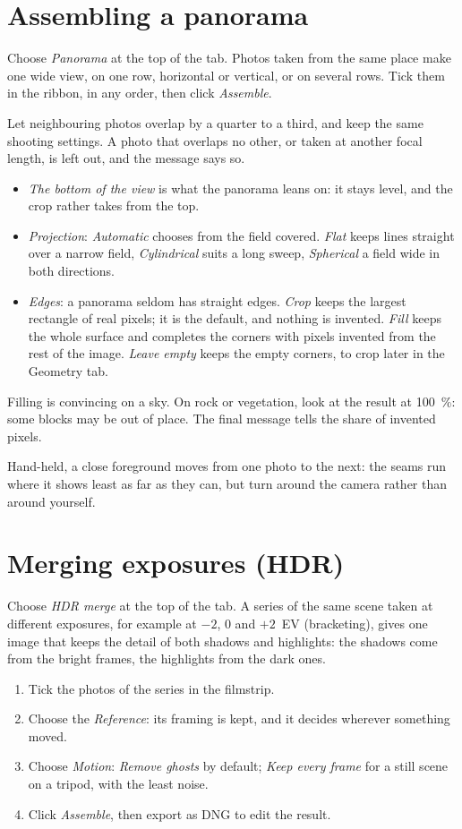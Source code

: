\section{Assembling a panorama}
Choose \emph{Panorama} at the top of the tab. Photos taken from the same place make one wide
view, on one row, horizontal or vertical, or on several rows. Tick them in the ribbon, in any
order, then click \emph{Assemble}.

Let neighbouring photos overlap by a quarter to a third, and keep the same shooting settings.
A photo that overlaps no other, or taken at another focal length, is left out, and the message
says so.

\begin{itemize}
\item \emph{The bottom of the view} is what the panorama leans on: it stays level, and the
crop rather takes from the top.
\item \emph{Projection}: \emph{Automatic} chooses from the field covered. \emph{Flat} keeps
lines straight over a narrow field, \emph{Cylindrical} suits a long sweep, \emph{Spherical} a
field wide in both directions.
\item \emph{Edges}: a panorama seldom has straight edges. \emph{Crop} keeps the largest
rectangle of real pixels; it is the default, and nothing is invented. \emph{Fill} keeps the
whole surface and completes the corners with pixels invented from the rest of the image.
\emph{Leave empty} keeps the empty corners, to crop later in the Geometry tab.
\end{itemize}
Filling is convincing on a sky. On rock or vegetation, look at the result at 100~\%: some blocks
may be out of place. The final message tells the share of invented pixels.

Hand-held, a close foreground moves from one photo to the next: the seams run where it shows
least as far as they can, but turn around the camera rather than around yourself.

\section{Merging exposures (HDR)}
Choose \emph{HDR merge} at the top of the tab. A series of the same scene taken at different
exposures, for example at $-2$, $0$ and $+2$~EV (bracketing), gives one image that keeps the
detail of both shadows and highlights: the shadows come from the bright frames, the highlights
from the dark ones.

\begin{enumerate}
\item Tick the photos of the series in the filmstrip.
\item Choose the \emph{Reference}: its framing is kept, and it decides wherever something
moved.
\item Choose \emph{Motion}: \emph{Remove ghosts} by default; \emph{Keep every frame} for a
still scene on a tripod, with the least noise.
\item Click \emph{Assemble}, then export as DNG to edit the result.
\end{enumerate}

